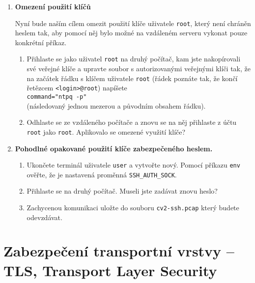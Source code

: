 \documentclass[a4paper,11pt]{article}
\begin{document}
\begin{enumerate}
\begin{enumerate}
    \end{enumerate}

  \item {\bf Omezení použití klíčů}

    Nyní bude naším cílem omezit použití klíče uživatele {\tt root}, který není chráněn heslem tak, aby pomocí něj bylo možné na vzdáleném serveru vykonat pouze konkrétní příkaz.

    \begin{enumerate}

      \item Přihlaste se jako uživatel {\tt root} na druhý počítač, kam jste nakopírovali své veřejné klíče a upravte soubor s autorizovanými veřejnými klíči tak, že na začátek řádku s klíčem uživatele {\tt root} (řádek poznáte tak, že končí řetězcem
        {\tt <login>@root}) napíšete \\
        \verb|command="ntpq -p" | \\
        (následovaný jednou mezerou a původním obsahem řádku).

      \item Odhlaste se ze vzdáleného počítače a znovu se na něj přihlaste z účtu {\tt root} jako {\tt root}.
        Aplikovalo se omezené využití klíče?

    \end{enumerate}


  \item {\bf Pohodlné opakované použití klíče zabezpečeného heslem.}

    \begin{enumerate}

      \item Ukončete terminál uživatele {\tt user} a vytvořte nový.
        Pomocí příkazu \verb|env| ověřte, že je nastavená proměnná \verb|SSH_AUTH_SOCK|.

      \item Přihlaste se na druhý počítač.
        Museli jste zadávat znovu heslo?

      \item Zachycenou komunikaci uložte do souboru {\tt cv2-ssh.pcap} který budete odevzdávat.

    \end{enumerate}

\end{enumerate}

\section{Zabezpečení transportní vrstvy -- TLS, Transport Layer Security}
\end{document}
